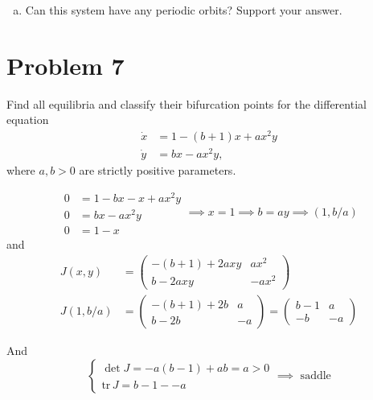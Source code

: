 \documentclass[12pt]{article}
\newcommand{\tr}{\text{tr}\,}
\begin{document}
\begin{enumerate}[(a)]
\begin{center}
          \end{center}

    \item Can this system have any periodic orbits? Support your answer.
\end{enumerate}

\pagebreak

\section{Problem 7}
Find all equilibria and classify their bifurcation points for the differential equation
\begin{align*}
    \dot x & = 1 -(b + 1)x + ax^2y \\
    \dot y & = bx -ax^2y,
\end{align*}
where $a,b > 0$ are strictly positive parameters.

\color{blue}
\[\begin{array}{rl}
        0 & = 1 - bx - x + ax^2y \\
        0 & = bx - ax^2y         \\ \hline
        0 & = 1 - x
    \end{array} \implies x = 1 \implies b = ay \implies (1, b/a)\]
and
\begin{align*}
    J(x, y)   & = \begin{pmatrix}
                      -(b + 1) + 2axy & ax^2  \\
                      b - 2axy        & -ax^2
                  \end{pmatrix}        \\
    J(1, b/a) & = \begin{pmatrix}
                      -(b+1) + 2b & a  \\
                      b - 2b      & -a
                  \end{pmatrix} = \begin{pmatrix}
                                      b - 1 & a  \\
                                      -b    & -a
                                  \end{pmatrix}
\end{align*}

And
\[\begin{cases}
        \det J = -a(b-1) + ab = a > 0 \\
        \tr J = b - 1 - -a
    \end{cases} \implies \text{ saddle}\]


\color{black}
\end{document}
